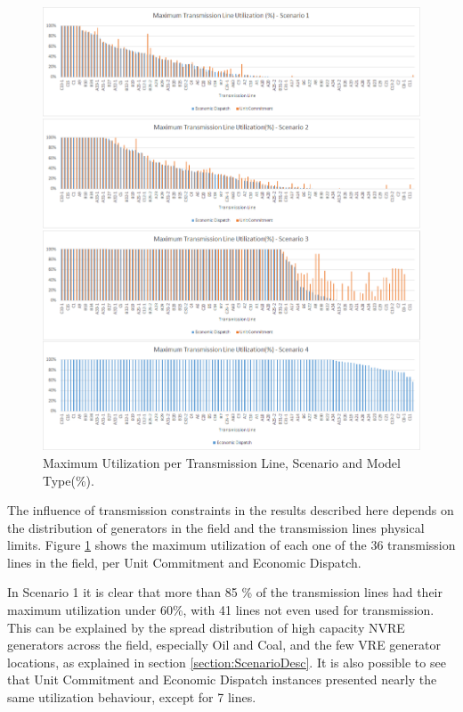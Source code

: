 \documentclass[12pt,LUDisStyle,twosided]{book}
\begin{document}
\begin{figure}[H] 
  \centering
  
	  \includegraphics[width=\textwidth,height=\textheight,keepaspectratio]{MaximumTransmissionLineUtilization.png}
  
  \caption{Maximum Utilization per Transmission Line, Scenario and Model Type(\%).}
  \label{fig:maximumutilizaton}
\end{figure}

The influence of transmission constraints in the results described here depends on the distribution of generators in the field and the transmission lines physical limits. Figure \ref{fig:maximumutilizaton} shows the maximum utilization of each one of the 36 transmission lines in the field, per Unit Commitment and Economic Dispatch. 

In Scenario 1 it is clear that more than 85 \% of the transmission lines had their maximum utilization under 60\%, with 41 lines not even used for transmission.  This can be explained by the spread distribution of high capacity NVRE generators across the field, especially Oil and Coal, and the few VRE generator locations, as explained in section    \ref{section:ScenarioDesc}. It is also possible to see that Unit Commitment and Economic Dispatch instances presented nearly the same utilization behaviour, except for 7 lines. 
\end{document}

